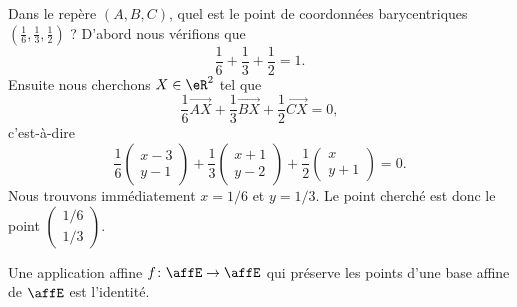 \begin{example}
	Dans le repère \( (A,B,C)\), quel est le point de coordonnées barycentriques \( (\frac{1}{ 6 },\frac{1}{ 3 },\frac{1}{ 2 })\) ? D'abord nous vérifions que
	\begin{equation}
		\frac{1}{ 6 }+\frac{1}{ 3 }+\frac{1}{ 2 }=1.
	\end{equation}
	Ensuite nous cherchons \( X\in \eR^2\) tel que
	\begin{equation}
		\frac{1}{ 6 }\overrightarrow{ AX }+\frac{1}{ 3 }\overrightarrow{ BX }+\frac{1}{ 2 }\overrightarrow{ CX }=0,
	\end{equation}
	c'est-à-dire
	\begin{equation}
		\frac{1}{ 6 }\begin{pmatrix}
			x-3 \\
			y-1
		\end{pmatrix}+\frac{1}{ 3 }\begin{pmatrix}
			x+1 \\
			y-2
		\end{pmatrix}+\frac{1}{ 2 }\begin{pmatrix}
			x \\
			y+1
		\end{pmatrix}=0.
	\end{equation}
	Nous trouvons immédiatement \( x=1/6\) et \( y=1/3\). Le point cherché est donc le point \( \begin{pmatrix}
		1/6 \\
		1/3
	\end{pmatrix}\).
\end{example}

\begin{lemma}       \label{LEMooDUMVooFtfFOe}
	Une application affine \( f\colon \affE\to \affE\) qui préserve les points d'une base affine de \( \affE\) est l'identité.
\end{lemma}

